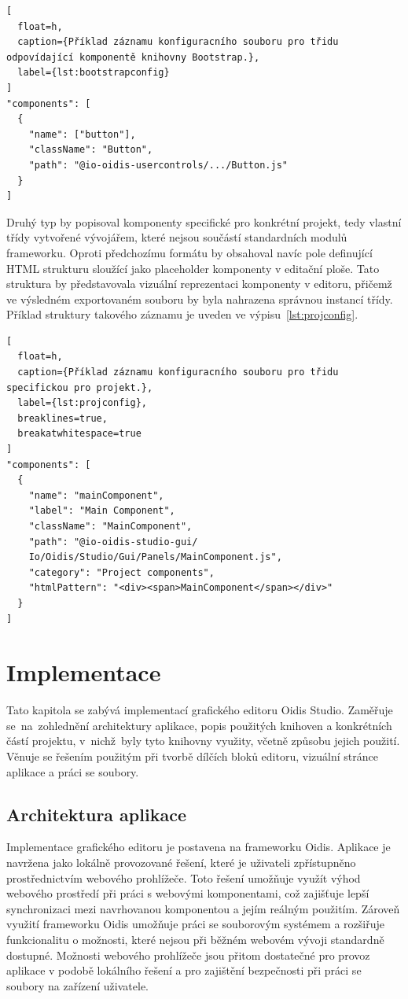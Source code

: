 \begin{lstlisting}[
  float=h,
  caption={Příklad záznamu konfiguracního souboru pro třidu odpovídající komponentě knihovny Bootstrap.},
  label={lst:bootstrapconfig}
]
"components": [
  {
    "name": ["button"],
    "className": "Button",
    "path": "@io-oidis-usercontrols/.../Button.js"
  }
]
\end{lstlisting}

Druhý typ by popisoval komponenty specifické pro konkrétní projekt, tedy vlastní třídy vytvořené vývojářem, které nejsou součástí standardních modulů frameworku. Oproti předchozímu formátu by obsahoval navíc pole definující HTML strukturu sloužící jako placeholder komponenty v editační ploše. Tato struktura by představovala vizuální reprezentaci komponenty v editoru, přičemž ve výsledném exportovaném souboru by byla nahrazena správnou instancí třídy. Příklad struktury takového záznamu je uveden ve výpisu~\ref{lst:projconfig}.

\begin{lstlisting}[
  float=h,
  caption={Příklad záznamu konfiguracního souboru pro třidu specifickou pro projekt.},
  label={lst:projconfig},
  breaklines=true,
  breakatwhitespace=true
]
"components": [
  {
    "name": "mainComponent",
    "label": "Main Component",
    "className": "MainComponent",
    "path": "@io-oidis-studio-gui/
    Io/Oidis/Studio/Gui/Panels/MainComponent.js",
    "category": "Project components",
    "htmlPattern": "<div><span>MainComponent</span></div>"
  }
]
\end{lstlisting}

\chapter{Implementace}
\label{Implementace}

Tato kapitola se zabývá implementací grafického editoru Oidis Studio. Zaměřuje se~na~zohlednění architektury aplikace, popis použitých knihoven a konkrétních částí projektu, v~nichž~byly tyto knihovny využity, včetně způsobu jejich použití. Věnuje se řešením použitým při tvorbě dílčích bloků editoru, vizuální stránce aplikace a práci se soubory.

\section{Architektura aplikace}

Implementace grafického editoru je postavena na frameworku Oidis. Aplikace je navržena jako lokálně provozované řešení, které je uživateli zpřístupněno prostřednictvím webového prohlížeče. Toto řešení umožňuje využít výhod webového prostředí při práci s webovými komponentami, což zajišťuje lepší synchronizaci mezi navrhovanou komponentou a jejím reálným použitím. Zároveň využití frameworku Oidis umožňuje práci se souborovým systémem a rozšiřuje funkcionalitu o možnosti, které nejsou při běžném webovém vývoji standardně dostupné. Možnosti webového prohlížeče jsou přitom dostatečné pro provoz aplikace v podobě lokálního řešení a pro zajištění bezpečnosti při práci se soubory na zařízení uživatele.


